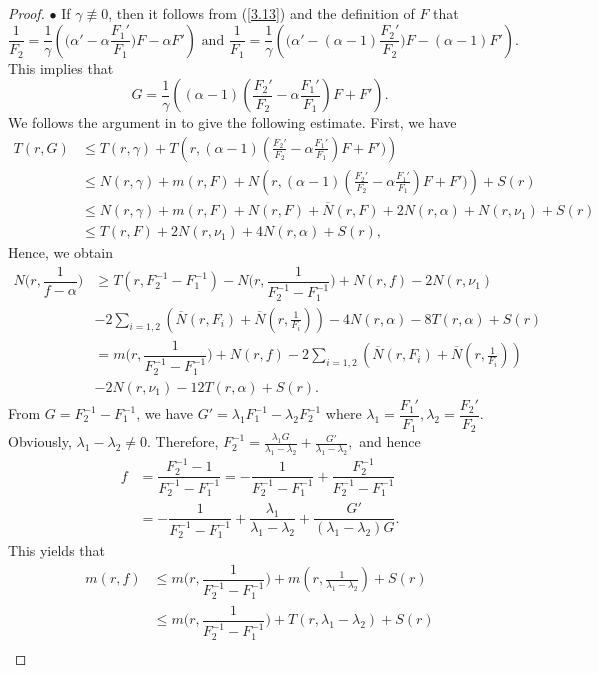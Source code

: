 \documentclass[10pt,a4paper]{amsart}
\begin{document}
\begin{proof}
$\bullet$ If $\gamma \not\equiv 0$, then it follows from (\ref{3.13}) and the definition of $F$ that
$$\frac{1}{F_2}=\frac{1}{\gamma}\left(\Big(\alpha'-\alpha\dfrac{F_1'}{F_1}\Big)F-\alpha F'\right)\text{ and } \frac{1}{F_1}=\frac{1}{\gamma}\left(\Big(\alpha'-(\alpha-1)\dfrac{F_2'}{F_2}\Big)F-(\alpha-1)F'\right).$$
This implies that
$$G=\frac{1}{\gamma}\left((\alpha-1)(\frac{F_2'}{F_2}-\alpha\frac{F_1'}{F_1})F+F'\right).$$
We follows the argument in \cite{QK} to give the following estimate. First, we have
\begin{align*}
T(r,G)&\le T(r,\gamma)+T\left(r,(\alpha-1)(\frac{F_2'}{F_2}-\alpha\frac{F_1'}{F_1})F+F')\right)\\
&\le N(r,\gamma)+m(r,F)+N\left(r,(\alpha-1)(\frac{F_2'}{F_2}-\alpha\frac{F_1'}{F_1})F+F')\right)+S(r)\\
&\le N(r,\gamma)+m(r,F)+N(r,F)+\overline N(r,F)+2N(r,\alpha)+N(r,\nu_1)+S(r)\\
&\le T(r,F)+2N(r,\nu_1)+4N(r,\alpha)+S(r),
\end{align*}
Hence, we obtain
\begin{align*}
N\Big(r,\dfrac{1}{f-\alpha}\Big) &\ge T(r,F_2^{-1}-F_1^{-1})-N\Big(r,\dfrac{1}{F_2^{-1}-F_1^{-1}}\Big)+N(r,f)-2N(r,\nu_1)\\
&-2\sum_{i=1,2}\left (\overline{N}(r,F_i)+\overline N(r,\frac{1}{F_i})\right)-4N(r,\alpha)-8T(r,\alpha)+S(r)\\
&=m\Big(r,\dfrac{1}{F_2^{-1}-F_1^{-1}}\Big)+N(r,f)-2\sum_{i=1,2}\left (\overline{N}(r,F_i)+\overline N(r,\frac{1}{F_i})\right)\\
&-2N(r,\nu_1)-12T(r,\alpha)+S(r).
\end{align*}
From $G=F_2^{-1}-F_1^{-1}$, we have $G'=\lambda_1 F_1^{-1}-\lambda_2 F_2^{-1}$ where $\lambda_1=\dfrac{F_1'}{F_1},\lambda_2=\dfrac{F_2'}{F_2}$. Obviously, $\lambda_1-\lambda_2 \neq 0$. Therefore,
$F_2^{-1}=\frac{\lambda_1 G}{\lambda_1-\lambda_2}+\frac{G'}{\lambda_1-\lambda_2},$
and hence
\begin{align*}
f&=\dfrac{F_2^{-1}-1}{F_2^{-1}-F_1^{-1}}=-\dfrac{1}{F_2^{-1}-F_1^{-1}}+\dfrac{F_2^{-1}}{F_2^{-1}-F_1^{-1}}\\
&=-\dfrac{1}{F_2^{-1}-F_1^{-1}}+\dfrac{\lambda_1}{\lambda_1-\lambda_2}+\dfrac{G'}{(\lambda_1-\lambda_2)G}.
\end{align*}
This yields that
\begin{align*}
m(r,f)&\le m\Big(r,\dfrac{1}{F_2^{-1}-F_1^{-1}}\Big)+m(r,\frac{1}{\lambda_1-\lambda_2})+S(r)\\
&\le m\Big(r,\dfrac{1}{F_2^{-1}-F_1^{-1}}\Big)+T(r,\lambda_1-\lambda_2)+S(r)\\

\end{align*}
\end{proof}
\end{document}

